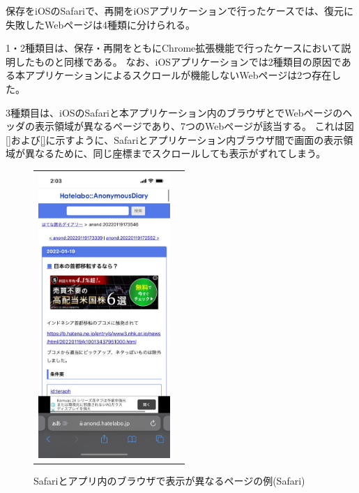 保存をiOSのSafariで、再開をiOSアプリケーションで行ったケースでは、復元に失敗したWebページは4種類に分けられる。

1・2種類目は、保存・再開をともにChrome拡張機能で行ったケースにおいて説明したものと同様である。
なお、iOSアプリケーションでは2種類目の原因である本アプリケーションによるスクロールが機能しないWebページは2つ存在した。

3種類目は、iOSのSafariと本アプリケーション内のブラウザとでWebページのヘッダの表示領域が異なるページであり、7つのWebページが該当する。
これは図\ref{}および\ref{}に示すように、Safariとアプリケーション内ブラウザ間で画面の表示領域が異なるために、同じ座標までスクロールしても表示がずれてしまう。

\begin{figure}[htbp]
  \begin{tabular}{cc}
    \begin{minipage}[t]{0.45\hsize}
      \caption{Safariとアプリ内のブラウザで表示が異なるページの例(Safari)}
      \label{fig:evl-consideration-scroll-position-ios-diff-safari}
      \begin{center}
        \includegraphics[bb=0 0 585 1266,width=5cm]{img/060_evaluation/consideration/scroll_position/example/ios-diff-safari.pdf}
      \end{center}
    \end{minipage} &


\end{tabular}
\end{figure}
